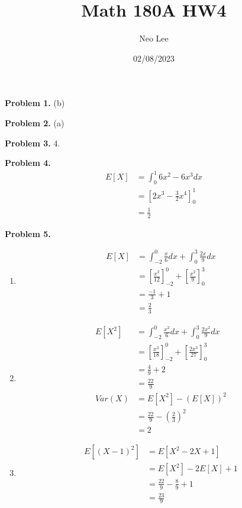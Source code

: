 \documentclass{article}
\title{Math 180A HW4}
\author{Neo Lee}
\date{02/08/2023}
\begin{document}
 

\maketitle 

\textbf{Problem 1.} (b)
\bigbreak

\textbf{Problem 2.} (a)
\bigbreak

\textbf{Problem 3.} 4.
\bigbreak

\textbf{Problem 4.} 
\begin{align}
    E[X] & = \int_{0}^{1}6x^2-6x^3dx \\
    & = \left[2x^3 - \frac{3}{2}x^4\right]_0^1 \\ 
    & = \frac{1}{2}
\end{align}
\bigbreak

\textbf{Problem 5.}
\begin{enumerate}[label={(\alph*)}]
    \item 
    \begin{align}
        E[X] & = \int_{-2}^{0}\frac{x}{6}dx + \int_{0}^{3} \frac{2x}{9}dx \\
        & = \left[\frac{x^2}{12}\right]_{-2}^0 + \left[\frac{x^2}{9}\right]_0^3 \\
        & = \frac{-1}{3} + 1 \\
        & = \frac{2}{3}
    \end{align}

    \item 
    \begin{align}
        E[X^2] & = \int_{-2}^{0}\frac{x^2}{6}dx + \int_{0}^{3}\frac{2x^2}{9}dx \\
        & = \left[\frac{x^3}{18}\right]_{-2}^0 + \left[\frac{2x^3}{27}\right]_0^3 \\
        & = \frac{4}{9} + 2 \\
        & = \frac{22}{9} \\
        Var(X) & = E[X^2] - (E[X])^2 \\
        & = \frac{22}{9} - \left(\frac{2}{3}\right)^2 \\
        & = 2
    \end{align}

    \item 
    \begin{align}
        E[(X-1)^2] & = E[X^2-2X+1] \\
        & = E[X^2]-2E[X]+1 \\
        & = \frac{22}{9} - \frac{8}{9}+1 \\
        & = \frac{23}{9}
    \end{align}
\end{enumerate}
\bigbreak
\end{document}

